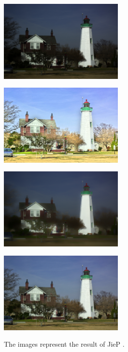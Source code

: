 \begin{figure}[tb]
	\begin{minipage}[b]{0.5\hsize}
		\centering
		\includegraphics[width=62.5mm]{images/jiep/input.eps}
		 \label{fig:jiep/input}
	\end{minipage}
	\begin{minipage}[b]{0.5\hsize}
		\centering
		\includegraphics[width=62.5mm]{images/jiep/reflectance.eps}
		 \label{fig:jiep/reflectance}
	\end{minipage}
	\begin{minipage}[b]{0.5\hsize}
		\centering
		\includegraphics[width=62.5mm]{images/jiep/illumination.eps}
		 \label{fig:jiep/illumination}
	\end{minipage}
	\begin{minipage}[b]{0.5\hsize}
		\centering
		\includegraphics[width=62.5mm]{images/jiep/output.eps}
		 \label{fig:jiep/output}
	\end{minipage}
	\caption{The images represent the result of JieP \cite{jiep}.}
	\label{fig:jiep/example}
\end{figure}

